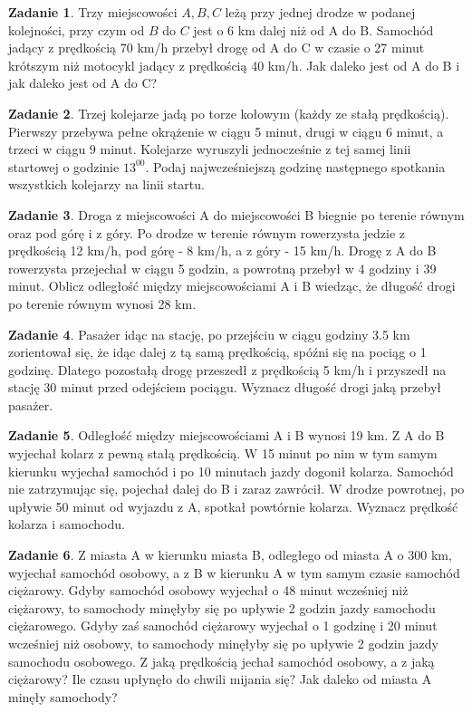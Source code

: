 \documentclass[11pt]{article}
\theoremstyle{definition}
\newtheorem{zad}{Zadanie}
\begin{document}
\begin{zad}
Trzy miejscowości $A, B, C$ leżą przy jednej drodze w podanej kolejności, przy czym od $B$ do $C$ jest o 6 km dalej niż od A do B. Samochód jadący z prędkością 70 km/h przebył drogę od A do C w czasie o 27 minut krótszym niż motocykl jadący z prędkością 40 km/h. Jak daleko jest od A do B i jak daleko jest od A do C?
\end{zad}

\begin{zad}
Trzej kolejarze jadą po torze kołowym (każdy ze stałą prędkością). Pierwszy przebywa pełne okrążenie w ciągu 5 minut, drugi w ciągu 6 minut, a trzeci w ciągu 9 minut. Kolejarze wyruszyli jednocześnie z tej samej linii startowej o godzinie $13^{00}$. Podaj najwcześniejszą godzinę następnego spotkania wszystkich kolejarzy na linii startu.
\end{zad}

\begin{zad}
Droga z miejscowości A do miejscowości B biegnie po terenie równym oraz pod górę i z góry. Po drodze w terenie równym rowerzysta jedzie z prędkością 12 km/h, pod górę - 8 km/h, a z góry - 15 km/h. Drogę z A do B rowerzysta przejechał w ciągu 5 godzin, a powrotną przebył w 4 godziny i 39 minut. Oblicz odległość między miejscowościami A i B wiedząc, że długość drogi po terenie równym wynosi 28 km.
\end{zad}

\begin{zad}
Pasażer idąc na stację, po przejściu w ciągu godziny 3.5 km zorientował się, że idąc dalej z tą samą prędkością, spóźni się na pociąg o 1 godzinę. Dlatego pozostałą drogę przeszedł z prędkością 5 km/h i przyszedł na stację 30 minut przed odejściem pociągu. Wyznacz długość drogi jaką przebył pasażer.
\end{zad}

\begin{zad}
Odległość między miejscowościami A i B wynosi 19 km. Z A do B wyjechał kolarz z pewną stałą prędkością. W 15 minut po nim w tym samym kierunku wyjechał samochód i po 10 minutach jazdy dogonił kolarza. Samochód nie zatrzymując się, pojechał dalej do B i zaraz zawrócił. W drodze powrotnej, po upływie 50 minut od wyjazdu z A, spotkał powtórnie kolarza. Wyznacz prędkość kolarza i samochodu.
\end{zad}

\begin{zad}
Z miasta A w kierunku miasta B, odległego od miasta A o 300 km, wyjechał samochód osobowy, a z B w kierunku A w tym samym czasie samochód ciężarowy. Gdyby samochód osobowy wyjechał o 48 minut wcześniej niż ciężarowy, to samochody minęłyby się po upływie 2 godzin jazdy samochodu ciężarowego. Gdyby zaś samochód ciężarowy wyjechał o 1 godzinę i 20 minut wcześniej niż osobowy, to samochody minęłyby się po upływie 2 godzin jazdy samochodu osobowego. Z jaką prędkością jechał samochód osobowy, a z jaką ciężarowy? Ile czasu upłynęło do chwili mijania się? Jak daleko od miasta A minęły samochody?
\end{zad}
\end{document}
